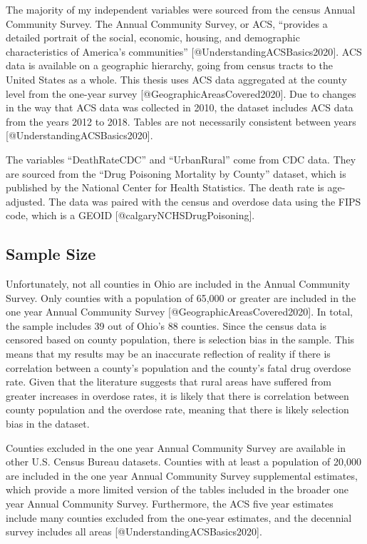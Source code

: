 \documentclass[
]{article}
\begin{document}
The majority of my independent variables were sourced from the census
Annual Community Survey. The Annual Community Survey, or ACS, ``provides
a detailed portrait of the social, economic, housing, and demographic
characteristics of America's communities''
{[}@UnderstandingACSBasics2020{]}. ACS data is available on a geographic
hierarchy, going from census tracts to the United States as a whole.
This thesis uses ACS data aggregated at the county level from the
one-year survey {[}@GeographicAreasCovered2020{]}. Due to changes in the
way that ACS data was collected in 2010, the dataset includes ACS data
from the years 2012 to 2018. Tables are not necessarily consistent
between years {[}@UnderstandingACSBasics2020{]}.

The variables ``DeathRateCDC'' and ``UrbanRural'' come from CDC data.
They are sourced from the ``Drug Poisoning Mortality by County''
dataset, which is published by the National Center for Health
Statistics. The death rate is age-adjusted. The data was paired with the
census and overdose data using the FIPS code, which is a GEOID
{[}@calgaryNCHSDrugPoisoning{]}.

\hypertarget{sample-size}{%
\subsection{Sample Size}\label{sample-size}}

Unfortunately, not all counties in Ohio are included in the Annual
Community Survey. Only counties with a population of 65,000 or greater
are included in the one year Annual Community Survey
{[}@GeographicAreasCovered2020{]}. In total, the sample includes 39 out
of Ohio's 88 counties. Since the census data is censored based on county
population, there is selection bias in the sample. This means that my
results may be an inaccurate reflection of reality if there is
correlation between a county's population and the county's fatal drug
overdose rate. Given that the literature suggests that rural areas have
suffered from greater increases in overdose rates, it is likely that
there is correlation between county population and the overdose rate,
meaning that there is likely selection bias in the dataset.

Counties excluded in the one year Annual Community Survey are available
in other U.S. Census Bureau datasets. Counties with at least a
population of 20,000 are included in the one year Annual Community
Survey supplemental estimates, which provide a more limited version of
the tables included in the broader one year Annual Community Survey.
Furthermore, the ACS five year estimates include many counties excluded
from the one-year estimates, and the decennial survey includes all areas
{[}@UnderstandingACSBasics2020{]}.
\end{document}
